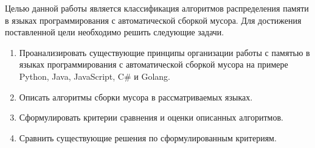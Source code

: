 Целью данной работы является классификация алгоритмов распределения памяти в языках программирования с автоматической сборкой мусора. Для достижения поставленной цели необходимо решить следующие задачи.

\begin{enumerate}[label*=\arabic*.]
	\item Проанализировать существующие принципы организации работы с памятью в языках программирования с автоматической сборкой мусора на примере Python, Java, JavaScript, C\# и Golang.
	\item Описать алгоритмы сборки мусора в рассматриваемых языках.
	\item Сформулировать критерии сравнения и оценки описанных алгоритмов.
	\item Сравнить существующие решения по сформулированным критериям. 
\end{enumerate}